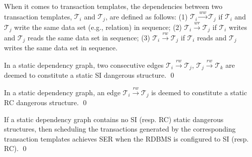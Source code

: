 
When it comes to transaction templates, the dependencies between two transaction templates, $\mathcal{T}_i$ and $\mathcal{T}_j$, are defined as follows: (1) $\mathcal{T}_i \xrightarrow{ww} \mathcal{T}_j$ if $\mathcal{T}_i$ and $\mathcal{T}_j$ write the same data set (e.g., relation) in sequence; (2) $\mathcal{T}_i \xrightarrow{wr} \mathcal{T}_j$ if $\mathcal{T}_i$ writes and $\mathcal{T}_j$ reads the same data set in sequence; (3) $\mathcal{T}_i \xrightarrow{rw} \mathcal{T}_j$ if $\mathcal{T}_i$ reads and $\mathcal{T}_j$ writes the same data set in sequence.


\begin{definition}
    \label{def:sta_si}
    In a static dependency graph, two consecutive edges $\mathcal{T}_i \xrightarrow{rw} \mathcal{T}_j$, $\mathcal{T}_j \xrightarrow{rw} \mathcal{T}_k$ are deemed to constitute a static SI dangerous structure.
    \qed
\end{definition}

\begin{definition}
    \label{def:sta_rc}
    In a static dependency graph, an edge $\mathcal{T}_i \xrightarrow{rw} \mathcal{T}_j$ is deemed to constitute a static RC dangerous structure.
    \qed
\end{definition}

\begin{theorem}
\label{the:RC}
If a static dependency graph contains no SI (resp. RC) static dangerous structures, then scheduling the transactions generated by the corresponding transaction templates achieves SER when the RDBMS is configured to SI (resp. RC).
\qed
\end{theorem}


